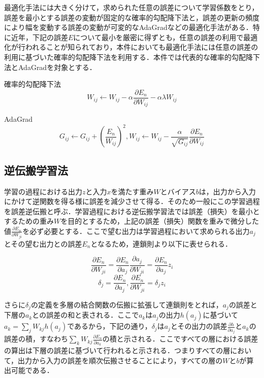 \documentclass{jsarticle}
\begin{document}
最適化手法には大きく分けて，求められた任意の誤差について学習係数をとり，誤差を最小とする誤差の変動が固定的な確率的勾配降下法と，誤差の更新の頻度により幅を変動する誤差の変動が可変的なAdaGradなどの最適化手法がある．特に近年，下記の誤差$E$について最小を厳密に得ずとも，任意の誤差の利用で最適化が行われることが知られており，本件においても最適化手法には任意の誤差の利用に基づいた確率的勾配降下法を利用する．本件では代表的な確率的勾配降下法とAdaGradを対象とする．

\begin{itembox}[l]{確率的勾配降下法}
\[
W_{ij} \leftarrow W_{ij} - \alpha \frac{\partial E_n}{\partial W_{ij}} - \alpha \lambda W_{ij}
\]
\end{itembox}

\begin{itembox}[l]{AdaGrad}
\[
G_{ij} \leftarrow G_{ij} + (\frac{E_n}{W_{ij}})^2,
W_{ij} \leftarrow W_{ij} - \frac{\alpha}{\sqrt{G_{ij}}} \frac{\partial E_n}{\partial W_{ij}}
\]
\end{itembox}

\subsection{逆伝搬学習法}
\label{逆伝搬学習法}

学習の過程における出力$z$と入力$x$を満たす重み$W$とバイアス$b$は，出力から入力にかけて逆関数を得る様に誤差を減少させて得る．そのため一般にこの学習過程を誤差逆伝搬と呼ぶ．学習過程における逆伝搬学習法では誤差（損失）を最小とするための重み$W$を目的とするため，上記の誤差（損失）関数を重みで微分した値$\frac{\partial E_n}{\partial W_{ji}}$を必ず必要とする．ここで望む出力は学習過程において求められる出力$a_j$とその望む出力との誤差$E_n$となるため，連鎖則より以下に表せられる．

\[
\frac{\partial E_n}{\partial W_{ji}} = \frac{\partial E_n}{\partial a_j} \frac{\partial a_j}{\partial W_{ji}} = \frac{\partial E_n}{\partial a_j} z_i
\]
\[
\delta_j = \frac{\partial E_n}{\partial a_j}, \frac{\partial E_n}{\partial W_{ji}} =\delta_j z_i
\]

さらに$\delta_j$の定義を多層の結合関数の伝搬に拡張して連鎖則をとれば，$a_j$の誤差と下層の$a_k$との誤差の和と表される．ここで$a_k$は$a_j$の出力$h(a_j)$に基づいて$a_k=\sum_{j} W_{kj} h(a_j)$であるから，下記の通り，$\delta_j$は$a_j$とその出力の誤差$\frac{\partial h}{\partial a_j}$と$a_k$の誤差の積，すなわち$\sum_k W_{kj} \frac{\partial E_n}{\partial a_k}$の積と示される．ここですべての層における誤差の算出は下層の誤差に基づいて行われると示される．つまりすべての層において，出力から入力の誤差を順次伝搬させることにより，すべての層の$W$と$b$が算出可能である．
\end{document}
